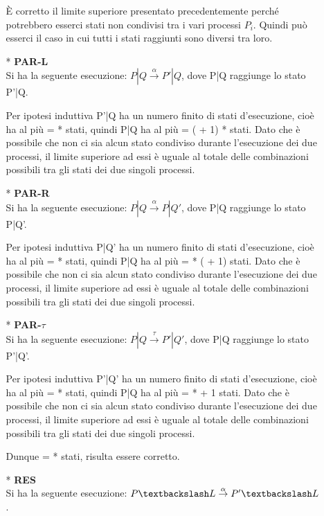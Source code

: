 \begin{itemize}
\begin{itemize}
		È corretto il limite superiore presentato precedentemente perché potrebbero esserci stati non condivisi tra i vari processi $P_{i}$. Quindi può esserci il caso in cui tutti i stati raggiunti sono diversi tra loro.
		\\
		\item[*] \textbf{PAR-L}
		\\
		Si ha la seguente esecuzione: $P|Q \overset{\alpha}\rightarrow P'|Q$, dove P|Q raggiunge lo stato P'|Q.
		
		Per ipotesi induttiva P'|Q ha un numero finito di stati d'esecuzione, cioè ha al più  =  *  stati, quindi P|Q ha al più  = ( + 1) *  stati. Dato che è possibile che non ci sia alcun stato condiviso durante l'esecuzione dei due processi, il limite superiore ad essi è uguale al totale delle combinazioni possibili tra gli stati dei due singoli processi.	
		\\
		\item[*] \textbf{PAR-R}
		\\
		Si ha la seguente esecuzione: $P|Q \overset{\alpha}\rightarrow P|Q'$, dove P|Q raggiunge lo stato P|Q'.
		
		Per ipotesi induttiva P|Q' ha un numero finito di stati d'esecuzione, cioè ha al più  =  *  stati, quindi P|Q ha al più  =  * ( + 1) stati. Dato che è possibile che non ci sia alcun stato condiviso durante l'esecuzione dei due processi, il limite superiore ad essi è uguale al totale delle combinazioni possibili tra gli stati dei due singoli processi.
		\\
		\item[*] \textbf{PAR-$\tau$}
		\\
		Si ha la seguente esecuzione: $P|Q \overset{\tau}\rightarrow P'|Q'$, dove P|Q raggiunge lo stato P'|Q'.
		
		Per ipotesi induttiva P'|Q' ha un numero finito di stati d'esecuzione, cioè ha al più  =  *  stati, quindi P|Q ha al più  =  *  + 1 stati. Dato che è possibile che non ci sia alcun stato condiviso durante l'esecuzione dei due processi, il limite superiore ad essi è uguale al totale delle combinazioni possibili tra gli stati dei due singoli processi.
		
		Dunque  =  *  stati, risulta essere corretto.
		\\
		\item[*] \textbf{RES}
		\\
		Si ha la seguente esecuzione: $P \textbackslash L \overset{\alpha}\rightarrow P' \textbackslash L$. 
		

\end{itemize}
\end{itemize}
